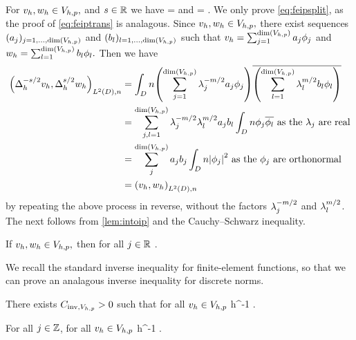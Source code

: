 \label{lem:intoip}
For $v_{h}, w_{h} \in V_{h,p},$ and $s \in \mathbb R$ we have
\beq\label{eq:feipsplit}
\IPLtDn{\Deltahmst \vh}{\Deltahst \wh} = \IPLtDn{\vh}{\wh}
\eeq
and
\beq\label{eq:feiptrans}
\IPLtDn{\Deltahst \vh}{\Deltahst \vh} =  .
\eeq
\ele
{}
We only prove \cref{eq:feipsplit}, as the proof of \cref{eq:feiptrans} is analagous. Since $v_{h},w_{h} \in V_{h,p},$ there exist sequences $(\aj)_{j =1,\ldots,\dimVhp}$ and $(\bsl)_{l =1,\ldots,\dimVhp}$ such that $\vh = \sum_{j=1}^{\dimVhp} \aj\phij$ and $\wh = \sum_{l=1}^{\dimVhp} \bsl \phil.$ Then we have
\begin{align*}
\IPLtDn{\Deltahmst \vh}{\Deltahst \wh} &= \int_D n\mleft(\sum_{j=1}^{\dimVhp}\lambdaj^{-m/2} \aj\phij\mright)\overline{\mleft(\sum_{l=1}^{\dimVhp} \lambdal^{m/2}\bsl \phil\mright)}\\
&= \sum_{j,l=1}^{\dimVhp} \lambdaj^{-m/2} \lambdal^{m/2} \aj \bsl \int_D n \phij \philbar \text{ as the } \lambdaj \text{ are real}\\
& =\sum_{j}^{\dimVhp} \aj \bsj \int_D n\abs{\phij}^2 \text{ as the } \phij \text{ are orthonormal}\\
&= \IPLtDn{\vh}{\wh}
\end{align*}
by repeating the above process in reverse, without the factors $\lambda_{j}^{-m/2}$ and $\lambda_{l}^{m/2}$.
\epf
The next  follows from \cref{lem:intoip} and the Cauchy--Schwarz inequality.

\label{cor:ipdiscbound}
If $v_{h}, w_{h} \in V_{h,p},$ then for all $j \in \mathbb R$
\beqs
\IPLtDn{\vh}{\wh} \leq \Njh{\vh}\Nmjh{\wh}.
\eeqs
\eco

We recall the standard inverse inequality for finite-element functions, so that we can prove an analagous inverse inequality for discrete norms.

\label{lem:inverseinequality}
There exists $C_{\mathrm{inv},V_{h,p}} > 0$ such that for all $v_{h} \in V_{h,p}$
\beqs
\NHoD{\vh} \leq \CinvVhp h^{-1} \NLtD{\vh}.
\eeqs
\ele



\label{lem:inversediscrete}
For all $j \in \mathbb Z$, for all $v_{h} \in V_{h,p}$
\beqs
\Njhn{\vh} \leq \Chinv {} h^{-1} \Njmohn{\vh}.
\eeqs
\ele

